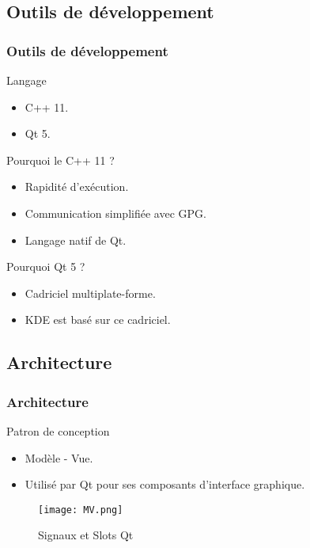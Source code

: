 \subsection{Outils de développement}
\begin{frame}
  \frametitle{\color{white} Outils de développement}
  \begin{block}{Langage}
    \begin{itemize}
      \item C++ 11.
      \item Qt 5.
    \end{itemize}
  \end{block}
  \begin{block}{Pourquoi le C++ 11 ?}
    \begin{itemize}
      \item Rapidité d'exécution.
      \item Communication simplifiée avec GPG.
      \item Langage natif de Qt.
    \end{itemize}
  \end{block}
  \begin{block}{Pourquoi Qt 5 ?}
    \begin{itemize}
      \item Cadriciel multiplate-forme.
      \item KDE est basé sur ce cadriciel.
    \end{itemize}
  \end{block}
\end{frame}
\subsection{Architecture}
\begin{frame}
  \frametitle{\color{white} Architecture}
  \begin{block}{Patron de conception}
    \begin{itemize}
      \item Modèle - Vue.
      \item Utilisé par Qt pour ses composants d'interface graphique.
    \end{itemize}
  \end{block}
  \begin{figure}[p]
    \centering
    \texttt{[image: MV.png]}
    \caption{Signaux et Slots Qt}
  \end{figure}
\end{frame}
